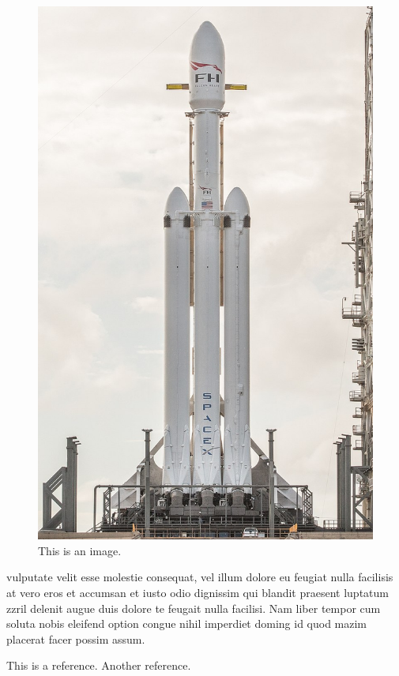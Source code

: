\documentclass[a4paper,10pt]{article}
\begin{document}
\begin{figure}
\begin{center}

\includegraphics[width=\linewidth]{Falcon_Heavy.jpg}

\caption{This is an image.}
\label{fig:falcon}
\end{center}
\end{figure}

vulputate velit esse molestie consequat, vel illum dolore eu feugiat nulla facilisis at vero eros et
accumsan et iusto odio dignissim qui blandit praesent luptatum zzril delenit augue duis dolore te feugait nulla facilisi.
Nam liber tempor cum soluta nobis eleifend option congue nihil imperdiet doming id quod mazim placerat facer possim assum.


\begin{thebibliography}{00}
This is a reference.
Another reference.
\end{thebibliography}
\end{document}
